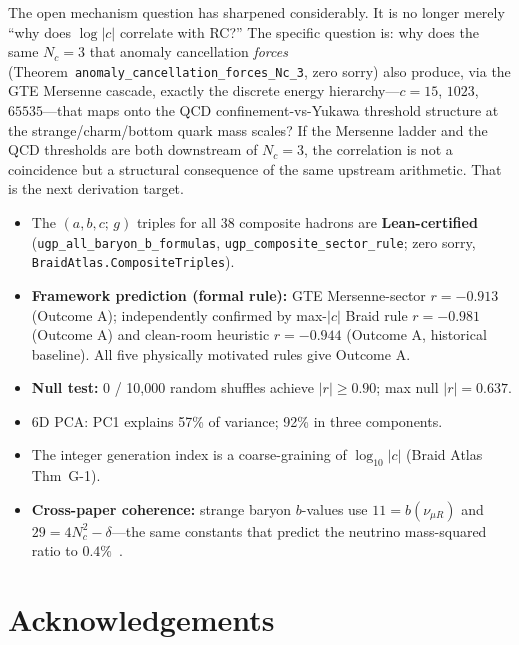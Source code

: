 \documentclass[12pt,a4paper]{article}
\begin{document}
The open mechanism question has sharpened considerably.
It is no longer merely ``why does $\log|c|$ correlate with RC?''
The specific question is: why does the same $N_c = 3$ that anomaly
cancellation \emph{forces} (Theorem~\texttt{anomaly\_cancellation\_forces\_Nc\_3},
zero sorry) also produce, via the GTE Mersenne cascade, exactly the discrete
energy hierarchy---$c = 15$, $1023$, $65535$---that maps onto the QCD
confinement-vs-Yukawa threshold structure at the strange/charm/bottom quark
mass scales?
If the Mersenne ladder and the QCD thresholds are both downstream of $N_c = 3$,
the correlation is not a coincidence but a structural consequence of the same
upstream arithmetic.
That is the next derivation target.

\begin{tcolorbox}[colback=blue!3!white, colframe=blue!50!black, title=Key Findings]
\begin{itemize}[leftmargin=1.5em, itemsep=2pt]
  \item The $(a,b,c;\,g)$ triples for all 38 composite hadrons are
    \textbf{Lean-certified} (\texttt{ugp\_all\_baryon\_b\_formulas}, \texttt{ugp\_composite\_sector\_rule};
    zero sorry, \texttt{BraidAtlas.CompositeTriples}).
  \item \textbf{Framework prediction (formal rule):} GTE Mersenne-sector
    $r=-0.913$ (Outcome A); independently confirmed by max-$|c|$ Braid rule
    $r=-0.981$ (Outcome A) and clean-room heuristic $r=-0.944$ (Outcome A,
    historical baseline). All five physically motivated rules give Outcome A.
  \item \textbf{Null test:} 0 / 10{,}000 random shuffles achieve $|r|\geq0.90$; max null $|r|=0.637$.
  \item 6D PCA: PC1 explains 57\% of variance; 92\% in three components.
  \item The integer generation index is a coarse-graining of $\log_{10}|c|$ (Braid Atlas Thm~G-1).
  \item \textbf{Cross-paper coherence:} strange baryon $b$-values use
    $11=b(\nu_{\mu R})$ and $29=4N_c^2{-}\delta$---the same constants that
    predict the neutrino mass-squared ratio to $0.4\%$~\cite{SpivackNeutrino}.
\end{itemize}
\end{tcolorbox}

\section*{Acknowledgements}
\end{document}
